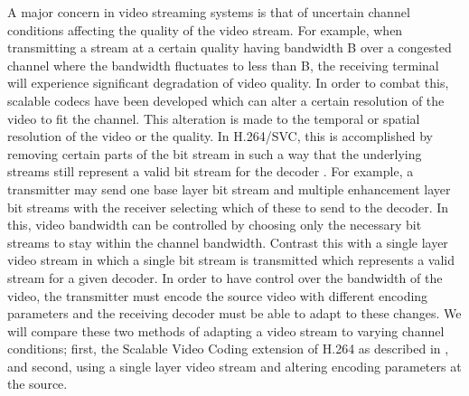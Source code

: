 \documentclass[a4paper,12pt]{article}
\begin{document}
A major concern in video streaming systems is that of uncertain channel conditions affecting the quality of the video stream. For example, when transmitting a stream at a certain quality having bandwidth B over a congested channel where the bandwidth fluctuates to less than B, the receiving terminal will experience significant degradation of video quality. In order to combat this, scalable codecs have been developed which can alter a certain resolution of the video to fit the channel. This alteration is made to the temporal or spatial resolution of the video or the quality. In H.264/SVC, this is accomplished by removing certain parts of the bit stream in such a way that the underlying streams still represent a valid bit stream for the decoder \cite{SVCOverview}. For example, a transmitter may send one base layer bit stream and multiple enhancement layer bit streams with the receiver selecting which of these to send to the decoder. In this, video bandwidth can be controlled by choosing only the necessary bit streams to stay within the channel bandwidth. Contrast this with a single layer video stream in which a single bit stream is transmitted which represents a valid stream for a given decoder. In order to have control over the bandwidth of the video, the transmitter must encode the source video with different encoding parameters and the receiving decoder must be able to adapt to these changes. We will compare these two methods of adapting a video stream to varying channel conditions; first, the Scalable Video Coding extension of H.264 as described in \cite{SVCOverview}, and second, using a single layer video stream and altering encoding parameters at the source. 
\end{document}
